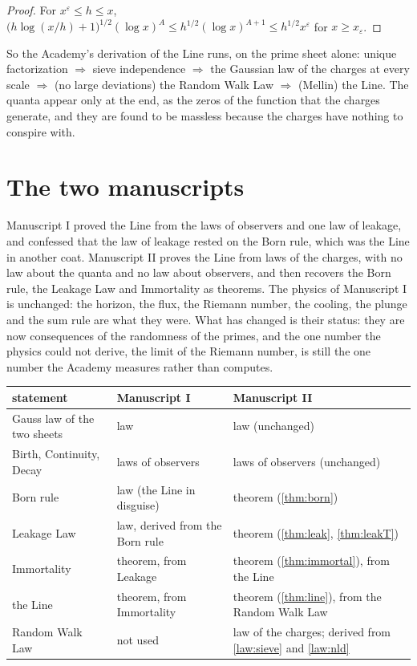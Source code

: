 \documentclass[11pt]{article}
\theoremstyle{definition}
\theoremstyle{remark}
\begin{document}
\begin{proof}
For $x^{\varepsilon}\le h\le x$, $\big(h\log(x/h)+1\big)^{1/2}(\log x)^A\le h^{1/2}(\log x)^{A+1}\le h^{1/2}x^{\varepsilon}$ for $x\ge x_\varepsilon$.
\end{proof}

So the Academy's derivation of the Line runs, on the prime sheet alone: unique factorization $\Rightarrow$ sieve independence $\Rightarrow$ the Gaussian law of the charges at every scale $\Rightarrow$ (no large deviations) the Random Walk Law $\Rightarrow$ (Mellin) the Line. The quanta appear only at the end, as the zeros of the function that the charges generate, and they are found to be massless because the charges have nothing to conspire with.

\section{The two manuscripts}

Manuscript I proved the Line from the laws of observers and one law of leakage, and confessed that the law of leakage rested on the Born rule, which was the Line in another coat. Manuscript II proves the Line from laws of the charges, with no law about the quanta and no law about observers, and then recovers the Born rule, the Leakage Law and Immortality as theorems. The physics of Manuscript I is unchanged: the horizon, the flux, the Riemann number, the cooling, the plunge and the sum rule are what they were. What has changed is their status: they are now consequences of the randomness of the primes, and the one number the physics could not derive, the limit of the Riemann number, is still the one number the Academy measures rather than computes.

\begin{center}
\begin{tabular}{@{}lll@{}}
\toprule
statement & Manuscript I & Manuscript II\\
\midrule
Gauss law of the two sheets & law & law (unchanged)\\
Birth, Continuity, Decay & laws of observers & laws of observers (unchanged)\\
Born rule & law (the Line in disguise) & theorem (\ref{thm:born})\\
Leakage Law & law, derived from the Born rule & theorem (\ref{thm:leak}, \ref{thm:leakT})\\
Immortality & theorem, from Leakage & theorem (\ref{thm:immortal}), from the Line\\
the Line & theorem, from Immortality & theorem (\ref{thm:line}), from the Random Walk Law\\
Random Walk Law & not used & law of the charges; derived from \ref{law:sieve} and \ref{law:nld}\\
\bottomrule
\end{tabular}
\end{center}
\end{document}
